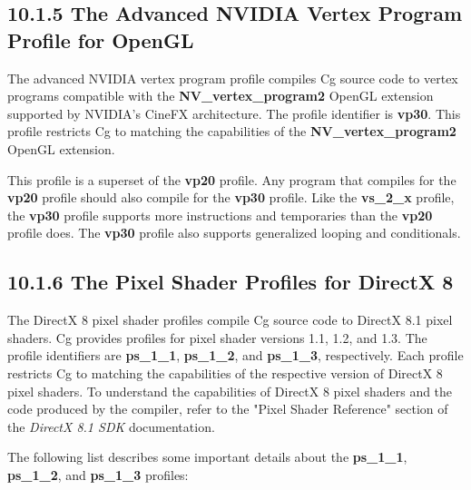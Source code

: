 \documentclass[../main.tex]{subfiles}
\begin{document}
\subsection{10.1.5 The Advanced NVIDIA Vertex Program Profile for OpenGL}

The advanced NVIDIA vertex program profile compiles Cg source code to vertex programs compatible with the \textbf{NV_vertex_program2} OpenGL extension supported by NVIDIA's CineFX architecture. The profile identifier is \textbf{vp30}. This profile restricts Cg to matching the capabilities of the \textbf{NV_vertex_program2} OpenGL extension.

This profile is a superset of the \textbf{vp20} profile. Any program that compiles for the \textbf{vp20} profile should also compile for the \textbf{vp30} profile. Like the \textbf{vs_2_x} profile, the \textbf{vp30} profile supports more instructions and temporaries than the \textbf{vp20} profile does. The \textbf{vp30} profile also supports generalized looping and conditionals.

\subsection{10.1.6 The Pixel Shader Profiles for DirectX 8}

The DirectX 8 pixel shader profiles compile Cg source code to DirectX 8.1 pixel shaders. Cg provides profiles for pixel shader versions 1.1, 1.2, and 1.3. The profile identifiers are \textbf{ps_1_1}, \textbf{ps_1_2}, and \textbf{ps_1_3}, respectively. Each profile restricts Cg to matching the capabilities of the respective version of DirectX 8 pixel shaders. To understand the capabilities of DirectX 8 pixel shaders and the code produced by the compiler, refer to the "Pixel Shader Reference" section of the \textit{DirectX 8.1 SDK} documentation.

The following list describes some important details about the \textbf{ps_1_1}, \textbf{ps_1_2}, and \textbf{ps_1_3} profiles:
\end{document}
